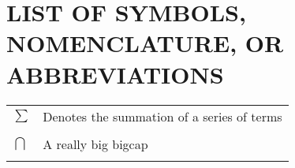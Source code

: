 

\chapter*{LIST OF SYMBOLS, NOMENCLATURE, OR ABBREVIATIONS} 
\singlespacing
\begin{tabular}{lp{5in}}
$\sum$ & Denotes the summation of a series of terms\\
\\
$\bigcap$ & A really big bigcap\\
\\
\end{tabular}
\doublespacing
